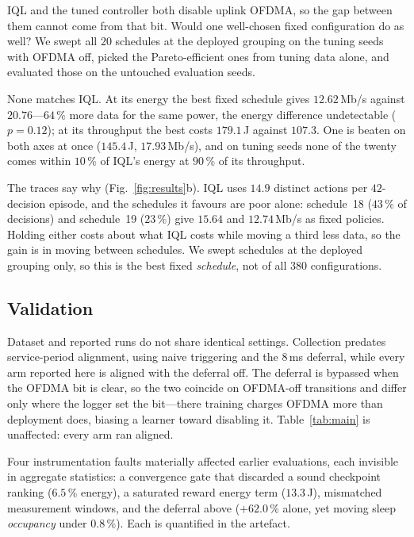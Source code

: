 IQL and the tuned controller both disable uplink OFDMA, so the gap between them
cannot come from that bit. Would one well-chosen fixed configuration do as
well? We swept all $20$ schedules at the deployed grouping on the tuning seeds
with OFDMA off, picked the Pareto-efficient ones from tuning data alone, and
evaluated those on the untouched evaluation seeds.

None matches IQL. At its energy the best fixed schedule gives $12.62$\,Mb/s
against $20.76$---$64\,\%$ more data for the same power, the energy difference
undetectable ($p = 0.12$); at its throughput the best costs $179.1$\,J against
$107.3$. One is beaten on both axes at once ($145.4$\,J, $17.93$\,Mb/s), and
on tuning seeds none of the twenty comes within $10\,\%$ of IQL's energy at
$90\,\%$ of its throughput.

The traces say why (Fig.~\ref{fig:results}b). IQL uses $14.9$ distinct actions
per $42$-decision episode, and the schedules it favours are poor alone: schedule~18 ($43\,\%$ of
decisions) and schedule~19 ($23\,\%$) give $15.64$ and $12.74$\,Mb/s as fixed
policies. Holding either costs about what IQL costs while moving a third less
data, so the gain is in moving between schedules. We swept schedules at the
deployed grouping only, so this is the best fixed \emph{schedule}, not of all
$380$ configurations.

\subsection{Validation}

Dataset and reported runs do not share identical settings. Collection predates
service-period alignment, using naive triggering and the $8$\,ms deferral,
while every arm reported here is aligned with the deferral off. The deferral is
bypassed when the OFDMA bit is clear, so the two coincide on OFDMA-off
transitions and differ only where the logger set the bit---there training
charges OFDMA more than deployment does, biasing a learner toward disabling it.
Table~\ref{tab:main} is unaffected: every arm ran aligned.

Four instrumentation faults materially affected earlier evaluations, each
invisible in aggregate statistics: a convergence gate that discarded a sound
checkpoint ranking ($6.5\,\%$ energy), a saturated reward energy term
($13.3$\,J), mismatched measurement windows, and the deferral above
($+62.0\,\%$ alone, yet moving sleep \emph{occupancy} under $0.8\,\%$). Each
is quantified in the artefact.
